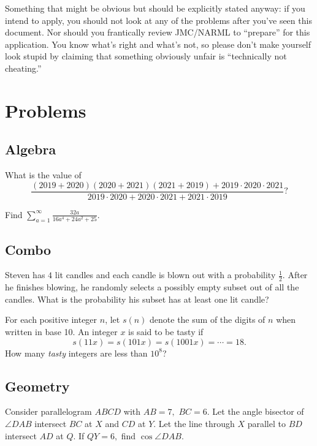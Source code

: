 \documentclass{lucky}
\newcommand{\problem}[2]{\noindent{\color{dennispurple}\bfseries #1. }#2}
\begin{document}
Something that might be obvious but should be explicitly stated anyway: if you intend to apply, you should not look at any of the problems after you've seen this document. Nor should you frantically review JMC/NARML to ``prepare'' for this application. You know what's right and what's not, so please don't make yourself look stupid by claiming that something obviously unfair is ``technically not cheating.''

\pagebreak

\section{Problems}

\subsection{Algebra}

\problem{A1}{What is the value of
\[\frac{(2019+2020)(2020+2021)(2021+2019)+2019\cdot 2020\cdot 2021}{2019\cdot 2020+2020\cdot 2021+2021\cdot 2019}?\]}\vspace{0.3cm} %

\problem{A2}{Find $\sum\limits_{a=1}^{\infty}\frac{32a}{16a^4+24a^2+25}.$} %

\subsection{Combo}

\problem{C1}{Steven has $4$ lit candles and each candle is blown out with a probability $\frac{1}{2}$. After he finishes blowing, he randomly selects a possibly empty subset out of all the candles. What is the probability his subset has at least one lit candle?}\vspace{0.3cm}

\problem{C2}{For each positive integer $n$, let $s(n)$ denote the sum of the digits of $n$ when written in base 10. An integer $x$ is said to be tasty if
\[s(11x) = s(101x) = s(1001x) = \cdots=18.\]How many \emph{tasty} integers are less than $10^8$?} %

\subsection{Geometry}

\problem{G1}{Consider parallelogram $ABCD$ with $AB=7,$ $BC=6.$ Let the angle bisector of $\angle DAB$ intersect $BC$ at $X$ and $CD$ at $Y.$ Let the line through $X$ parallel to $BD$ intersect $AD$ at $Q.$ If $QY=6,$ find $\cos\angle DAB.$}\vspace{0.3cm} %
\end{document}
